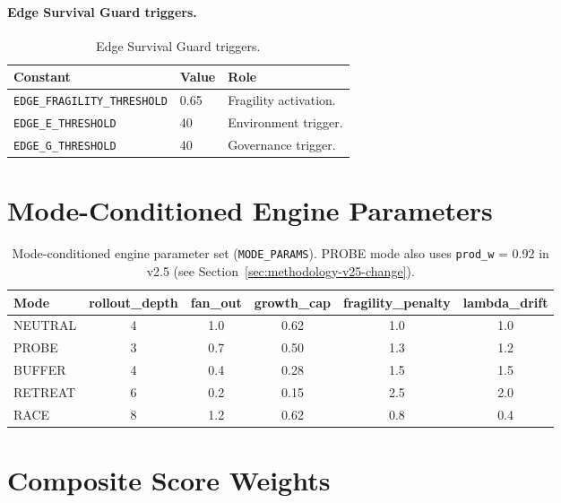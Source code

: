 \paragraph{Edge Survival Guard triggers.}

\begin{table}[ht]
\centering
\small
\begin{tabularx}{\linewidth}{Xll}
\toprule
\textbf{Constant} & \textbf{Value} & \textbf{Role} \\
\midrule
\texttt{EDGE\_FRAGILITY\_THRESHOLD} & 0.65 & Fragility activation. \\
\texttt{EDGE\_E\_THRESHOLD} & 40 & Environment trigger. \\
\texttt{EDGE\_G\_THRESHOLD} & 40 & Governance trigger. \\
\bottomrule
\end{tabularx}
\caption[Edge Guard triggers]{Edge Survival Guard triggers.}
\label{tab:edge-triggers}
\end{table}

\section{Mode-Conditioned Engine Parameters}
\label{sec:world-mode-params}

\begin{table}[ht]
\centering
\scriptsize
\begin{tabularx}{\linewidth}{Xccccc}
\toprule
\textbf{Mode} & \textbf{rollout\_depth} & \textbf{fan\_out} &
\textbf{growth\_cap} & \textbf{fragility\_penalty} &
\textbf{lambda\_drift} \\
\midrule
NEUTRAL & 4 & 1.0 & 0.62 & 1.0 & 1.0 \\
PROBE   & 3 & 0.7 & 0.50 & 1.3 & 1.2 \\
BUFFER  & 4 & 0.4 & 0.28 & 1.5 & 1.5 \\
RETREAT & 6 & 0.2 & 0.15 & 2.5 & 2.0 \\
RACE    & 8 & 1.2 & 0.62 & 0.8 & 0.4 \\
\bottomrule
\end{tabularx}
\caption[Mode-conditioned engine parameters]{Mode-conditioned engine
parameter set (\texttt{MODE\_PARAMS}). PROBE mode also uses
\texttt{prod\_w} = 0.92 in v2.5
(see Section~\ref{sec:methodology-v25-change}).}
\label{tab:mode-params}
\end{table}

\clearpage
\section{Composite Score Weights}
\label{sec:world-score-weights}

